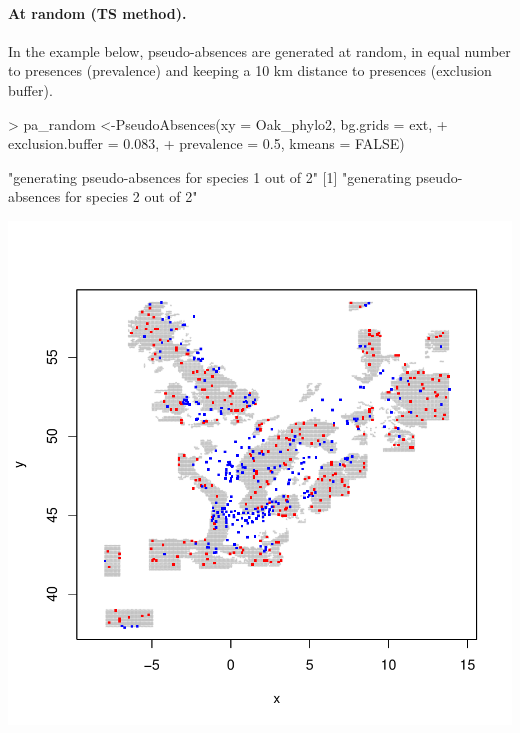\documentclass[10pt,a4paper]{article}
\begin{document}
\paragraph{At random (TS method).}

In the example below, pseudo-absences are generated at random, in equal number to presences (prevalence) and keeping a 10 km distance to presences (exclusion buffer).


\begin{Schunk}
\begin{Sinput}
> pa_random <-PseudoAbsences(xy = Oak_phylo2, bg.grids = ext, 
+                            exclusion.buffer = 0.083, 
+                            prevalence = 0.5, kmeans = FALSE)
\end{Sinput}
\begin{Soutput}
[1] "generating pseudo-absences for species 1 out of 2"
[1] "generating pseudo-absences for species 2 out of 2"
\end{Soutput}
\end{Schunk}
\includegraphics{mopa-mopa9}
\end{document}
